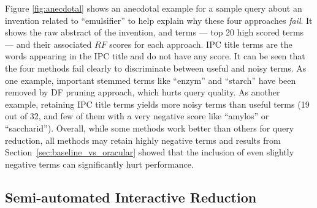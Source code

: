 
\vspace*{0.5mm}
Figure \ref{fig:anecdotal} shows an anecdotal example for a sample query about an invention related to ``emulsifier'' to help explain why these four approaches \emph{fail}. It shows the raw abstract of the invention, and terms --- top 20 high scored terms --- and their associated $\mathit{RF}$ scores for each approach. IPC title terms are the words appearing in the IPC title and do not have any score.
It can be seen that the four methods fail clearly to discriminate between useful and noisy terms. As one example, important stemmed terms like ``enzym'' and ``starch'' have been removed by DF pruning approach, which hurts query quality.  As another example, retaining IPC title terms yields more noisy terms than useful terms (19 out of 32, and few of them with a very negative score like ``amylos'' or ``saccharid'').  Overall, while some methods work better than others for query reduction, all methods may retain highly negative terms and results from Section~\ref{sec:baseline_vs_oracular} showed that the inclusion of even slightly negative terms can significantly hurt performance.
 


\subsection{Semi-automated Interactive Reduction}

\label{sec:SemiAutomatedInteractiveReduction}

